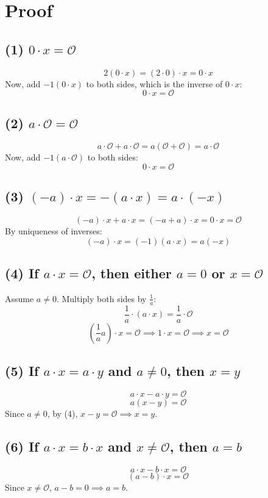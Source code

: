 \documentclass{article}
\begin{document}
\section*{Proof}

\subsection*{(1) $0 \cdot x = \mathcal{O}$}
\[
2(0 \cdot x) = (2 \cdot 0) \cdot x = 0 \cdot x
\]
Now, add $-1(0 \cdot x)$ to both sides, which is the inverse of $0 \cdot x$:
\[
0 \cdot x = \mathcal{O}
\]

\subsection*{(2) $a \cdot \mathcal{O} = \mathcal{O}$}
\[
a \cdot \mathcal{O} + a \cdot \mathcal{O} = a(\mathcal{O} + \mathcal{O}) = a \cdot \mathcal{O}
\]
Now, add $-1(a \cdot \mathcal{O})$ to both sides:
\[
0 \cdot x = \mathcal{O}
\]

\subsection*{(3) $(-a) \cdot x = -(a \cdot x) = a \cdot (-x)$}
\[
(-a) \cdot x + a \cdot x = (-a + a) \cdot x = 0 \cdot x = \mathcal{O}
\]
By uniqueness of inverses:
\[
(-a) \cdot x = (-1)(a \cdot x) = a(-x)
\]

\subsection*{(4) If $a \cdot x = \mathcal{O}$, then either $a = 0$ or $x = \mathcal{O}$}
Assume $a \neq 0$. Multiply both sides by $\frac{1}{a}$:
\[
\frac{1}{a} \cdot (a \cdot x) = \frac{1}{a} \cdot \mathcal{O}
\]
\[
(\frac{1}{a}a) \cdot x = \mathcal{O} \implies 1 \cdot x = \mathcal{O} \implies x = \mathcal{O}
\]

\subsection*{(5) If $a \cdot x = a \cdot y$ and $a \neq 0$, then $x = y$}
\[
a \cdot x - a \cdot y = \mathcal{O}
\]
\[
a(x - y) = \mathcal{O}
\]
Since $a \neq 0$, by (4), $x - y = \mathcal{O} \implies x = y$.

\subsection*{(6) If $a \cdot x = b \cdot x$ and $x \neq \mathcal{O}$, then $a = b$}
\[
a \cdot x - b \cdot x = \mathcal{O}
\]
\[
(a - b) \cdot x = \mathcal{O}
\]
Since $x \neq \mathcal{O}$, $a - b = 0 \implies a = b$.
\end{document}
